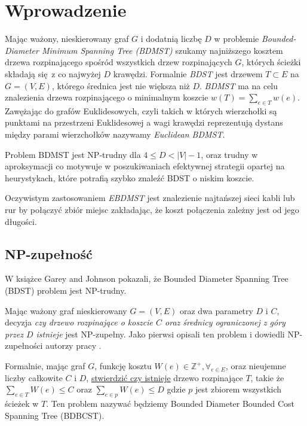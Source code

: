 \section{Wprowadzenie}
Mając ważony, nieskierowany graf $G$ i dodatnią liczbę $D$ w problemie \textit{Bounded-Diameter Minimum Spanning Tree (BDMST)} szukamy najniższego kosztem drzewa rozpinającego spośród wszystkich drzew rozpinających $G$, których ścieżki składają się z co najwyżej $D$ krawędzi. Formalnie \textit{BDST} jest drzewem $T \subset E$ na $G = (V, E)$, którego średnica jest nie większa niż $D$. \textit{BDMST} ma na celu znalezienia drzewa rozpinającego o minimalnym koszcie $w(T) = \sum_{e\in T} w(e)$. Zawężając do grafów Euklidesowych, czyli takich w których wierzchołki są punktami na przestrzeni Euklidesowej a wagi krawędzi reprezentują dystans między parami wierzchołków nazywamy \textit{Euclidean BDMST}.

Problem BDMST jest NP-trudny dla $4 \leq D < |V| - 1$, oraz trudny w aproksymacji co motywuje w poszukiwaniach efektywnej strategii opartej na heurystykach, które potrafią szybko znaleźć BDST o niskim koszcie.

Oczywistym zastosowaniem \textit{EBDMST} jest znalezienie najtańszej sieci kabli lub rur by połączyć zbiór miejsc zakładając, że koszt połączenia zależny jest od jego długości.


\subsection{NP-zupełność}

W książce \cite[p.~206]{10.5555/574848} Garey and Johnson pokazali, że Bounded Diameter Spanning Tree (BDST) problem jest NP-trudny.

Mając ważony graf nieskierowany $G = (V, E)$ oraz dwa parametry $D$ i $C$, decyzja \textit{czy drzewo rozpinające o koszcie $C$ oraz średnicy ograniczonej z góry przez $D$ istnieje} jest NP-zupełny. Jako pierwsi opisali ten problem i dowiedli NP-zupełności autorzy pracy \cite{DBLP:conf/compgeom/HoL89}.

Formalnie, mając graf $G$, funkcję kosztu $W(e) \in \mathbb{Z}^+, \forall_{e\in E}$, oraz nieujemne liczby całkowite $C$ i $D$, \underline{stwierdzić czy istnieje} drzewo rozpinające $T$, takie że $\sum_{e\in T} W(e) \leq C$ oraz $\sum_{e\in p} W(e) \leq D$ gdzie $p$ jest zbiorem wszystkich ścieżek w $T$. Ten problem nazywać będziemy Bounded Diameter Bounded Cost Spanning Tree (BDBCST).

